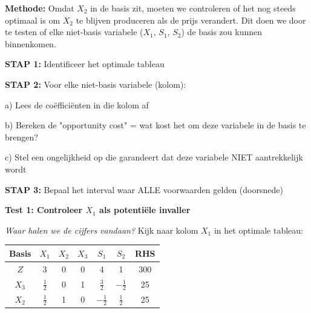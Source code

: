 \documentclass[a4paper,11pt]{article}
\begin{document}
\begin{oefenblok}
    \textbf{Methode:} Omdat $X_2$ in de basis zit, moeten we controleren of het nog steeds optimaal is om $X_2$ te blijven produceren als de prijs verandert. Dit doen we door te testen of elke niet-basis variabele ($X_1$, $S_1$, $S_2$) de basis zou kunnen binnenkomen.

    \vspace{0.3cm}

    \begin{warningbox}
        \textbf{STAP 1:} Identificeer het optimale tableau\par
        \textbf{STAP 2:} Voor elke niet-basis variabele (kolom):\par
        \quad a) Lees de coëfficiënten in die kolom af\par
        \quad b) Bereken de "opportunity cost" = wat kost het om deze variabele in de basis te brengen?\par
        \quad c) Stel een ongelijkheid op die garandeert dat deze variabele NIET aantrekkelijk wordt\par
        \textbf{STAP 3:} Bepaal het interval waar ALLE voorwaarden gelden (doorsnede)
    \end{warningbox}

    \vspace{0.4cm}

    \textbf{Test 1: Controleer $X_1$ als potentiële invaller}

    \textit{Waar halen we de cijfers vandaan?} Kijk naar kolom $X_1$ in het optimale tableau:

    \begin{center}
        \begin{tabular}{c|ccccc|c}
            \hline
            Basis & $X_1$                              & $X_2$ & $X_3$ & $S_1$          & $S_2$          & RHS \\
            \hline
            $Z$   & \cellcolor{yellow!30}3             & 0     & 0     & 4              & 1              & 300 \\
            $X_3$ & \cellcolor{yellow!30}$\frac{1}{2}$ & 0     & 1     & $\frac{3}{2}$  & $-\frac{1}{2}$ & 25  \\
            $X_2$ & \cellcolor{yellow!30}$\frac{1}{2}$ & 1     & 0     & $-\frac{1}{2}$ & $\frac{1}{2}$  & 25  \\
            \hline
        \end{tabular}
    \end{center}


\end{oefenblok}
\end{document}
